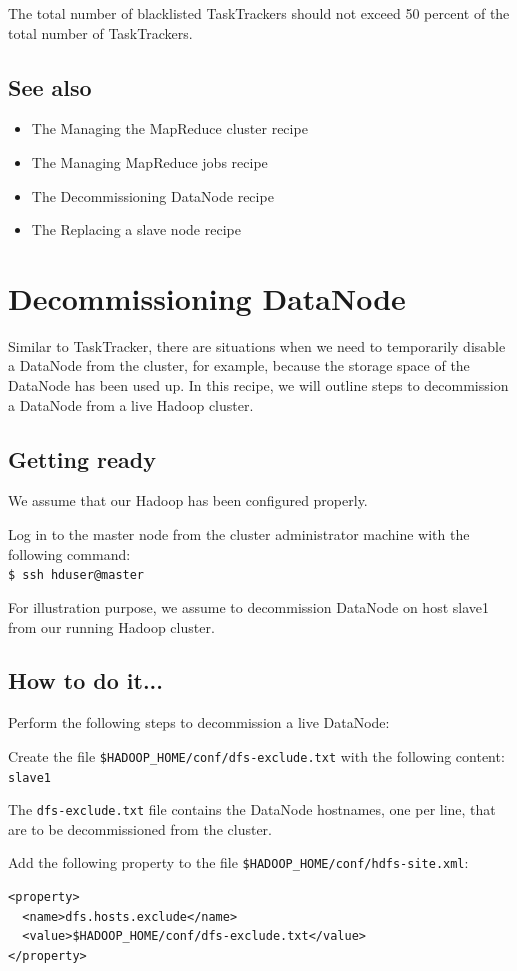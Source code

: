The total number of blacklisted TaskTrackers should not exceed 50 percent of the total number of TaskTrackers.
\subsection*{See also}
\begin{itemize}
  \item The Managing the MapReduce cluster recipe
  \item The Managing MapReduce jobs recipe
  \item The Decommissioning DataNode recipe
  \item The Replacing a slave node recipe
\end{itemize}

\section{Decommissioning DataNode}
Similar to TaskTracker, there are situations when we need to temporarily disable a DataNode from the cluster, for example, because the storage space of the DataNode has been used up. In this recipe, we will outline steps to decommission a DataNode from a live Hadoop cluster.
\subsection*{Getting ready}
We assume that our Hadoop has been configured properly.

Log in to the master node from the cluster administrator machine with the following command: \\
\verb|$ ssh hduser@master|

For illustration purpose, we assume to decommission DataNode on host slave1 from our running Hadoop cluster.
\subsection*{How to do it...}
Perform the following steps to decommission a live DataNode:

Create the file \verb|$HADOOP_HOME/conf/dfs-exclude.txt| with the following content:\\
\verb|slave1|

The \verb|dfs-exclude.txt| file contains the DataNode hostnames, one per line, that are to be decommissioned from the cluster.

Add the following property to the file \verb|$HADOOP_HOME/conf/hdfs-site.xml|:
\lstset{style=bashstyle}
\begin{lstlisting}
<property>
  <name>dfs.hosts.exclude</name>
  <value>$HADOOP_HOME/conf/dfs-exclude.txt</value>
</property>
\end{lstlisting}

